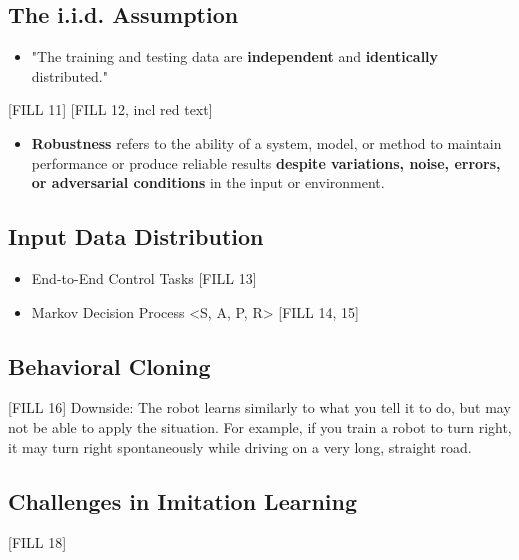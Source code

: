\documentclass[10pt]{article}
\begin{document}
\subsection*{The i.i.d. Assumption}
\begin{itemize}
	\item "The training and testing data are \textbf{independent} and \textbf{identically} distributed."
\end{itemize} 
[FILL 11]
[FILL 12, incl red text]
\begin{itemize}
	\item \textbf{Robustness} refers to the ability of a system, model, or method to maintain performance or produce reliable results \textbf{despite variations, noise, errors, or adversarial conditions} in the input or environment.
\end{itemize}

\subsection*{Input Data Distribution}
\begin{itemize}
	\item End-to-End Control Tasks
	[FILL 13]
    \item Markov Decision Process <S, A, P, R>
    [FILL 14, 15]
\end{itemize}

\subsection*{Behavioral Cloning}
[FILL 16]
Downside: The robot learns similarly to what you tell it to do, but may not be able to apply the situation.  For example, if you train a robot to turn right, it may turn right spontaneously while driving on a very long, straight road.

\subsection*{Challenges in Imitation Learning}
[FILL 18]
\end{document}
